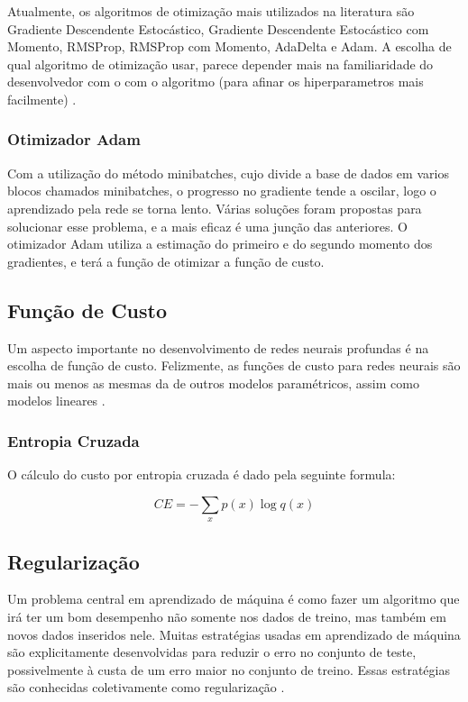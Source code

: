 \documentclass[12pt]{article}
\begin{document}
Atualmente, os algoritmos de otimização mais utilizados na literatura são Gradiente Descendente Estocástico, Gradiente Descendente Estocástico com Momento, RMSProp, RMSProp com Momento, AdaDelta e Adam. A escolha de qual algoritmo de otimização usar, parece depender mais na familiaridade do desenvolvedor com o com o algoritmo (para afinar os hiperparametros mais facilmente) \cite{Goodfellow-et-al-2016}.

\subsubsection{Otimizador Adam}

Com a utilização do método minibatches, cujo divide a base de dados em varios blocos chamados minibatches, o progresso no gradiente tende a oscilar, logo o aprendizado pela rede se torna lento. Várias soluções foram propostas para solucionar esse problema, e a mais eficaz é uma junção das anteriores. O otimizador Adam \cite{DBLP:journals/corr/KingmaB14} utiliza a estimação do primeiro e do segundo momento dos gradientes, e terá a função de otimizar a função de custo.

\subsection{Função de Custo}

Um aspecto importante no desenvolvimento de redes neurais profundas é na escolha de função de custo. Felizmente, as funções de custo para redes neurais são mais ou menos as mesmas da de outros modelos paramétricos, assim como modelos lineares \cite{Goodfellow-et-al-2016}.

\subsubsection{Entropia Cruzada}

O cálculo do custo por entropia cruzada é dado pela seguinte formula:

\begin{equation}
    CE = -\sum\limits_{x} p(x)\log q(x)
\end{equation}

\subsection{Regularização}

Um problema central em aprendizado de máquina é como fazer um algoritmo que irá ter um bom desempenho não somente nos dados de treino, mas também em novos dados inseridos nele. Muitas estratégias usadas em aprendizado de máquina são explicitamente desenvolvidas para reduzir o erro no conjunto de teste, possivelmente à custa de um erro maior no conjunto de treino. Essas estratégias são conhecidas coletivamente como regularização \cite{Goodfellow-et-al-2016}.
\end{document}
